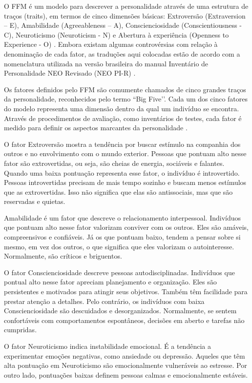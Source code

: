 O FFM é um modelo para descrever a personalidade através de uma estrutura de traços (traits), em termos de cinco dimensões básicas: Extroversão (Extraversion – E), Amabilidade (Agreeableness – A), Conscienciosidade (Conscientiousness - C), Neuroticismo (Neuroticism - N) e Abertura à experiência (Openness to Experience - O) \cite{mccrae:92}. Embora  existam  algumas  controvérsias com relação à denominação de cada fator, as traduções aqui colocadas estão de acordo com a nomenclatura utilizada na versão brasileira do manual Inventário de Personalidade NEO Revisado (NEO PI-R) \cite{flores:07}.

Os fatores definidos pelo FFM são comumente chamados de cinco grandes traços da personalidade, reconhecidos pelo termo ``Big Five’’. Cada um dos cinco fatores do modelo representa uma dimensão dentro da qual um indivíduo se encontra. Através de procedimentos de avaliação, como inventários de testes, cada fator é medido para definir os aspectos marcantes da personalidade \cite{costa:92b}.

O fator Extroversão mostra a tendência por buscar estímulo na companhia dos outros e no envolvimento com o mundo exterior. Pessoas que pontuam alto nesse fator são extrovertidas, ou seja, são cheias de energia, sociáveis e falantes. Quando uma baixa pontuação representa esse fator, o indivíduo é introvertido. Pessoas introvertidas precisam de mais tempo sozinho e buscam menos estímulos que as extrovertidas. Isso não significa que elas são antissociais, mas que são reservadas e quietas.

Amabilidade é um fator que descreve o relacionamento interpessoal. Indivíduos que pontuam alto nesse fator valorizam conviver com os outros. Eles são amáveis, compreensivos e confiáveis. Já os que pontuam baixo, tendem a pensar sobre si mesmo, em vez dos outros, o que significa que eles valorizam o autointeresse. Normalmente, são críticos e briguentos.

O fator Conscienciosidade descreve pessoas autodisciplinadas. Indivíduos que pontual alto nesse fator apreciam planejamento e organização. Eles são persistentes e motivados para atingir seus objetivos. Também têm facilidade para prestar atenção a detalhes. Pelo contrário, os indivíduos com baixa Conscienciosidade são descuidados e desorganizados. Normalmente, se sentem confortáveis com comportamentos espontâneos, decisões em aberto e tarefas não cumpridas.

O fator Neuroticismo indica instabilidade emocional. É a tendência a experimentar emoções negativas, como ansiedade ou depressão. Aqueles que têm alta pontuação em Neuroticismo são emocionalmente vulneráveis ao estresse. Por outro lado, pontuações baixas definem pessoas calmas e emocionalmente estáveis.

